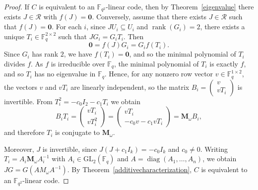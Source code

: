 \documentclass[a4paper,12pt]{article}
\theoremstyle{plain}
\theoremstyle{definition}
\begin{document}
\begin{proof} 
If $C$ is equivalent to an $\mathbb{F}_{q^2}$-linear code, then by Theorem~\ref{eigenvalue} there exists $J \in \mathcal{R}$ with $f(J) = \mathbf{0}$.
Conversely, assume that there exists $J \in \mathcal{R}$ such that $f(J) = \mathbf{0}$.
For each $i$, since $J U_i \subseteq U_i$ and $\operatorname{rank}(G_i) = 2$,   there exists a unique $T_i \in \mathbb{F}_q^{2 \times 2}$ such that 
$JG_i = G_iT_i.$
Then
\[
\mathbf{0} = f(J)G_i = G_i f(T_i).
\]
Since $G_i$ has rank $2$, we have $f(T_i) = \mathbf{0}$, and so the minimal polynomial of $T_i$ divides $f$. 
As $f$ is irreducible over $\mathbb{F}_q$, the minimal polynomial of $T_i$ is exactly $f$, and so $T_i$ has no eigenvalue in $\mathbb{F}_q$. 
Hence, for any nonzero row vector $v \in \mathbb{F}_q^{1 \times 2}$, the vectors $v$ and $vT_i$ are linearly independent, so the matrix $B_i = \begin{pmatrix} v \\ vT_i \end{pmatrix}$ is invertible. From $T_i^2 = -c_0 I_2 - c_1 T_i$ we obtain
\[
B_i T_i = \begin{pmatrix} vT_i \\ vT_i^2 \end{pmatrix} 
= \begin{pmatrix} vT_i \\ -c_0 v - c_1 vT_i \end{pmatrix} 
= \mathbf{M}_\omega B_i,
\]
and therefore $T_i$ is conjugate to   $\mathbf{M}_\omega$. 


Moreover, $J$ is invertible, since $J(J + c_1 I_k) = -c_0 I_k$ and $c_0 \neq 0$. 
Writing $T_i = A_i \mathbf{M}_\omega A_i^{-1}$ with $A_i \in \mathrm{GL}_2(\mathbb{F}_q)$ and $A = \operatorname{diag}(A_1, \dots, A_n)$, we obtain $JG = G(A M_\omega A^{-1})$.
By Theorem~\ref{additivecharacterization}, $C$ is equivalent to an $\mathbb F_{q^2}$-linear code.
\end{proof}
 
\end{document}
